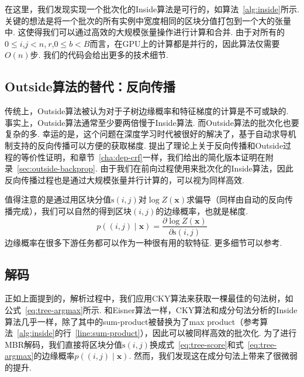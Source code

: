 在这里，我们发现实现一个批次化的Inside算法是可行的，如算法~\ref{alg:inside}所示.
关键的想法是将一个批次的所有实例中宽度相同的区块分值打包到一个大的张量中.
这使得我们可以通过高效的大规模张量操作进行计算和合并.
由于对所有的$0 \le i$,$j<n$,$~r$,$0\le b<B$而言，在GPU上的计算都是并行的，因此算法仅需要$O(n)$步.
我们的代码会给出更多的技术细节.

\subsection{Outside算法的替代：反向传播}

传统上，Outside算法被认为对于子树边缘概率和特征梯度的计算是不可或缺的.
事实上，Outside算法通常至少要两倍慢于Inside算法.
而Outside算法的批次化也要复杂的多.
幸运的是，这个问题在深度学习时代被很好的解决了，基于自动求导机制支持的反向传播可以方便的获取梯度.
\cite{eisner-2016-inside}提出了理论上关于反向传播和Outside过程的等价性证明，和章节~\ref{cha:dep-crf}一样，我们给出的简化版本证明在附录~\ref{sec:outside-backprop}.
由于我们在前向过程使用来批次化的Inside算法，因此反向传播过程也是通过大规模张量并行计算的，可以视为同样高效.

值得注意的是通过用区块分值$\mathrm{s}(i,j)$对$\log Z(\boldsymbol{x})$求偏导（同样由自动的反向传播完成），我们可以自然的得到区块$(i,j)$的边缘概率，也就是梯度.
\begin{equation} \label{eq:partial-derivative}
    p((i, j)\mid\boldsymbol{x}) = \frac{\partial \log Z(\boldsymbol{x})}{\partial \mathrm{s}(i, j)}
\end{equation}
边缘概率在很多下游任务都可以作为一种很有用的软特征.
更多细节可以参考\cite{eisner-2016-inside}.

\subsection{解码}

正如上面提到的，解析过程中，我们应用CKY算法来获取一棵最佳的句法树，如公式~\ref{eq:tree-argmax}所示.
和Eisner算法一样，CKY算法和成分句法分析的Inside算法几乎一样，除了其中的sum-product被替换为了max product（参考算法~\ref{alg:inside}的行~\ref{line:sum-product}），因此可以被同样高效的批次化.
为了进行MBR解码，我们直接将区块分值$\mathrm{s}(i,j)$换成式~\ref{eq:tree-score}和式~\ref{eq:tree-argmax}的边缘概率$p((i,j)\mid\boldsymbol{x})$.
然而，我们发现这在成分句法上带来了很微弱的提升.





